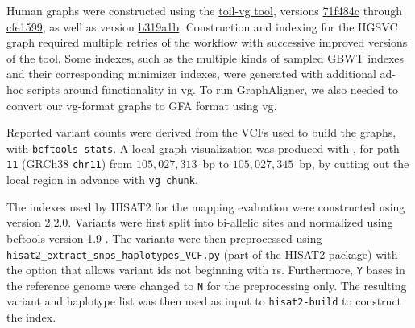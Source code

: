 \documentclass[11pt]{ucscthesis}
\newcommand{\toilvgcommit}[2]{\href{https://github.com/vgteam/toil-vg/commit/#1}{#2}}
\begin{document}
Human graphs were constructed using the \href{https://github.com/vgteam/toil-vg}{toil-vg tool}, versions \toilvgcommit{71f484ce519bb7eff2941a650638e98b4713b852}{71f484c} through \toilvgcommit{cfe15995a8da67257af1b9aca25fa1a686a839c4}{cfe1599}, as well as version \toilvgcommit{b319a1b22df6dac585b7f95bc1a603577452d443}{b319a1b}. 
Construction and indexing for the HGSVC graph required multiple retries of the workflow with successive improved versions of the tool.
Some indexes, such as the multiple kinds of sampled GBWT indexes and their corresponding minimizer indexes, were generated with additional ad-hoc scripts around functionality in vg.
To run GraphAligner, we also needed to convert our vg-format graphs to GFA format using vg.


Reported variant counts were derived from the VCFs used to build the graphs, with \texttt{bcftools stats}.
A local graph visualization was produced with \cite{beyer2019sequence}, for path \texttt{11} (GRCh38 \texttt{chr11}) from $105,027,313$~bp to $105,027,345$~bp, by cutting out the local region in advance with \texttt{vg chunk}.

The indexes used by HISAT2 for the mapping evaluation were constructed using version 2.2.0. 
Variants were first split into bi-allelic sites and normalized using bcftools version 1.9 \cite{li_samtools_2011}.
The variants were then preprocessed using\\ \texttt{hisat2\_extract\_snps\_haplotypes\_VCF.py} (part of the HISAT2 package) with the option that allows variant ids not beginning with rs.
Furthermore, \texttt{Y} bases in the reference genome were changed to \texttt{N} for the preprocessing only.
The resulting variant and haplotype list was then used as input to \texttt{hisat2-build} to construct the index.
\end{document}
